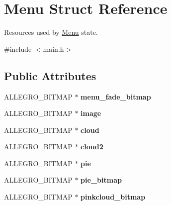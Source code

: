 \hypertarget{structMenu}{\section{\-Menu \-Struct \-Reference}
\label{structMenu}
}


\-Resources used by \hyperlink{structMenu}{\-Menu} state.  




{\ttfamily \#include $<$main.\-h$>$}

\subsection*{\-Public \-Attributes}
\begin{DoxyCompactItemize}
\item 
\hypertarget{structMenu_a4d3a2c17b2882c7adf10a15ba49932b4}{\-A\-L\-L\-E\-G\-R\-O\-\_\-\-B\-I\-T\-M\-A\-P $\ast$ {\bfseries menu\-\_\-fade\-\_\-bitmap}}\label{structMenu_a4d3a2c17b2882c7adf10a15ba49932b4}

\item 
\hypertarget{structMenu_a7ac035a3356434a3ce6eae45f876eba9}{\-A\-L\-L\-E\-G\-R\-O\-\_\-\-B\-I\-T\-M\-A\-P $\ast$ {\bfseries image}}\label{structMenu_a7ac035a3356434a3ce6eae45f876eba9}

\item 
\hypertarget{structMenu_a9abb4b7b9f726884aa378e746857b6f2}{\-A\-L\-L\-E\-G\-R\-O\-\_\-\-B\-I\-T\-M\-A\-P $\ast$ {\bfseries cloud}}\label{structMenu_a9abb4b7b9f726884aa378e746857b6f2}

\item 
\hypertarget{structMenu_a6ee03b8791791ecca4f9a3b9fb1851c1}{\-A\-L\-L\-E\-G\-R\-O\-\_\-\-B\-I\-T\-M\-A\-P $\ast$ {\bfseries cloud2}}\label{structMenu_a6ee03b8791791ecca4f9a3b9fb1851c1}

\item 
\hypertarget{structMenu_a397eb035f88ef8138c4ba29f3fc1d63c}{\-A\-L\-L\-E\-G\-R\-O\-\_\-\-B\-I\-T\-M\-A\-P $\ast$ {\bfseries pie}}\label{structMenu_a397eb035f88ef8138c4ba29f3fc1d63c}

\item 
\hypertarget{structMenu_ab46ce3041264bac0aabde3abd7549877}{\-A\-L\-L\-E\-G\-R\-O\-\_\-\-B\-I\-T\-M\-A\-P $\ast$ {\bfseries pie\-\_\-bitmap}}\label{structMenu_ab46ce3041264bac0aabde3abd7549877}

\item 
\hypertarget{structMenu_a970ef9c492ae797fc59d22fa6cfead71}{\-A\-L\-L\-E\-G\-R\-O\-\_\-\-B\-I\-T\-M\-A\-P $\ast$ {\bfseries pinkcloud\-\_\-bitmap}}\label{structMenu_a970ef9c492ae797fc59d22fa6cfead71}


\end{DoxyCompactItemize}
